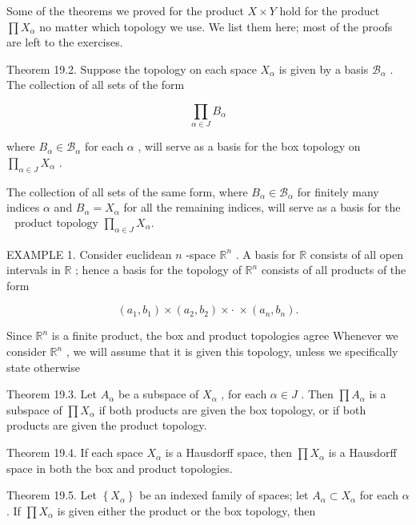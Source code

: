 Some of the theorems we proved for the product \(X \times  Y\) hold for the product \(\prod {X}_{\alpha }\) no matter which topology we use. We list them here; most of the proofs are left to the exercises.

Theorem 19.2. Suppose the topology on each space \({X}_{\alpha }\) is given by a basis \({\mathcal{B}}_{\alpha }\) . The collection of all sets of the form

\[
\mathop{\prod }\limits_{{\alpha  \in  J}}{B}_{\alpha }
\]

where \({B}_{\alpha } \in  {\mathcal{B}}_{\alpha }\) for each \(\alpha\) , will serve as a basis for the box topology on \(\mathop{\prod }\limits_{{\alpha  \in  J}}{X}_{\alpha }\) .

The collection of all sets of the same form, where \({B}_{\alpha } \in  {\mathcal{B}}_{\alpha }\) for finitely many indices \(\alpha\) and \({B}_{\alpha } = {X}_{\alpha }\) for all the remaining indices, will serve as a basis for the \(\begin{matrix} \text{ product topology }\mathop{\prod }\limits_{{\alpha  \in  J}}{X}_{\alpha }. \end{matrix}\)

EXAMPLE 1. Consider euclidean \(n\) -space \({\mathbb{R}}^{n}\) . A basis for \(\mathbb{R}\) consists of all open intervals in \(\mathbb{R}\) ; hence a basis for the topology of \({\mathbb{R}}^{n}\) consists of all products of the form

\[
\left( {{a}_{1},{b}_{1}}\right)  \times  \left( {{a}_{2},{b}_{2}}\right)  \times   \cdot  \; \times  \left( {{a}_{n},{b}_{n}}\right) .
\]

Since \({\mathbb{R}}^{n}\) is a finite product, the box and product topologies agree Whenever we consider \({\mathbb{R}}^{n}\) , we will assume that it is given this topology, unless we specifically state otherwise

Theorem 19.3. Let \({A}_{\alpha }\) be a subspace of \({X}_{\alpha }\) , for each \(\alpha  \in  J\) . Then \(\prod {A}_{\alpha }\) is a subspace of \(\prod {X}_{\alpha }\) if both products are given the box topology, or if both products are given the product topology.

Theorem 19.4. If each space \({X}_{\alpha }\) is a Hausdorff space, then \(\prod {X}_{\alpha }\) is a Hausdorff space in both the box and product topologies.

Theorem 19.5. Let \(\left\{  {X}_{\alpha }\right\}\) be an indexed family of spaces; let \({A}_{\alpha } \subset  {X}_{\alpha }\) for each \(\alpha\) . If \(\prod {X}_{\alpha }\) is given either the product or the box topology, then

